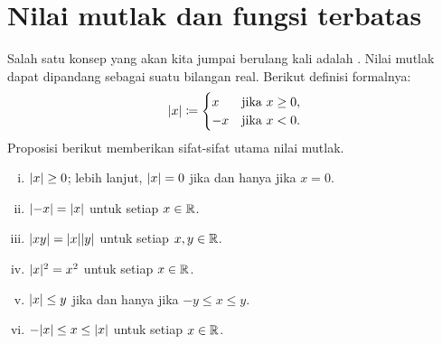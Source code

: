 
\sectionnewpage
\section{Nilai mutlak dan fungsi terbatas} \label{sec:absval}


Salah satu konsep yang akan kita jumpai berulang kali adalah
\emph{}.
Nilai mutlak dapat dipandang sebagai  suatu bilangan real.
Berikut definisi formalnya:
\begin{equation*}
\lvert {x} \rvert \coloneqq
\begin{cases}
x & \text{jika } x \geq 0, \\
-x & \text{jika } x < 0 .
\end{cases}
\end{equation*}
Proposisi berikut memberikan
sifat-sifat utama nilai
mutlak.

\begin{prop} \label{prop:absbas}
\leavevmode
\begin{enumerate}[(i)]
\item \label{prop:absbas:i} $\lvert {x} \rvert \geq 0$; lebih lanjut, $\lvert {x} \rvert=0$ jika dan hanya jika $x = 0$.
\item \label{prop:absbas:ii} $\lvert {-x} \rvert = \lvert {x} \rvert$ untuk setiap $x \in {\mathbb{R}}$.
\item \label{prop:absbas:iii} $\lvert {xy} \rvert = \lvert {x} \rvert\lvert {y} \rvert$ untuk setiap $x,y \in {\mathbb{R}}$.
\item \label{prop:absbas:iv} $\lvert {x} \rvert^2 = x^2$ untuk setiap $x \in {\mathbb{R}}$.
\item \label{prop:absbas:v} $\lvert {x} \rvert \leq y$ jika dan hanya jika $-y \leq x \leq y$.
\item \label{prop:absbas:vi} $-\lvert {x} \rvert \leq x \leq \lvert {x} \rvert$ untuk setiap $x \in {\mathbb{R}}$.
\end{enumerate}
\end{prop}

